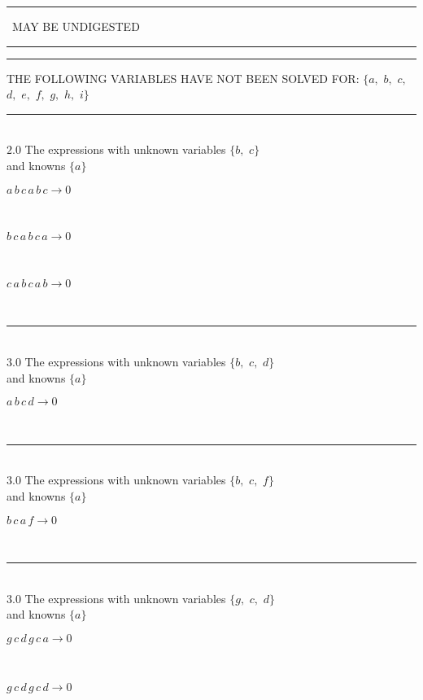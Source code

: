 \documentclass[rep10,leqno]{report}
\begin{document}
\rule[2pt]{2.18in}{4pt}
\ MAY BE UNDIGESTED\ 
\rule[2pt]{2.18in}{4pt}\hfil\break
\rule[2pt]{6in}{4pt}\hfil\break
THE FOLLOWING VARIABLES HAVE NOT BEEN SOLVED FOR:\hfil\break
$\{a,
$ $
b,
$ $
c,
$ $
d,
$ $
e,
$ $
f,
$ $
g,
$ $
h,
$ $
i\}$
\smallskip\\
\rule[3pt]{6in}{.7pt}\\
$2.0$  The expressions with unknown variables $\{b,
$ $
c\}$\\
and knowns $\{a\}$\smallskip\\
\begin{minipage}{6in}
$
a\,
 b\,
 c\,
 a\,
 b\,
 c\rightarrow 0
$
\end{minipage}\medskip \\
\begin{minipage}{6in}
$
b\,
 c\,
 a\,
 b\,
 c\,
 a\rightarrow 0
$
\end{minipage}\medskip \\
\begin{minipage}{6in}
$
c\,
 a\,
 b\,
 c\,
 a\,
 b\rightarrow 0
$
\end{minipage}\\
\rule[3pt]{6in}{.7pt}\\
$3.0$  The expressions with unknown variables $\{b,
$ $
c,
$ $
d\}$\\
and knowns $\{a\}$\smallskip\\
\begin{minipage}{6in}
$
a\,
 b\,
 c\,
 d\rightarrow 0
$
\end{minipage}\\
\rule[3pt]{6in}{.7pt}\\
$3.0$  The expressions with unknown variables $\{b,
$ $
c,
$ $
f\}$\\
and knowns $\{a\}$\smallskip\\
\begin{minipage}{6in}
$
b\,
 c\,
 a\,
 f\rightarrow 0
$
\end{minipage}\\
\rule[3pt]{6in}{.7pt}\\
$3.0$  The expressions with unknown variables $\{g,
$ $
c,
$ $
d\}$\\
and knowns $\{a\}$\smallskip\\
\begin{minipage}{6in}
$
g\,
 c\,
 d\,
 g\,
 c\,
 a\rightarrow 0
$
\end{minipage}\medskip \\
\begin{minipage}{6in}
$
g\,
 c\,
 d\,
 g\,
 c\,
 d\rightarrow 0
$
\end{minipage}\\
\end{document}
